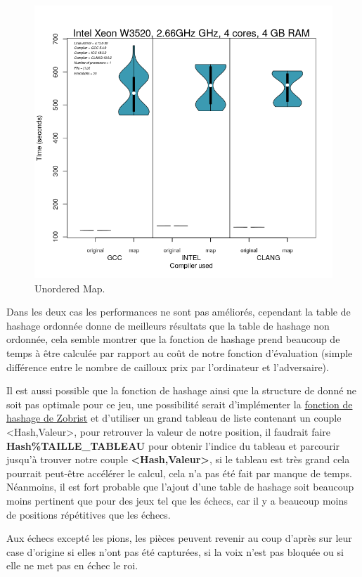\documentclass[
 aip,
 jmp,
 amsmath,amssymb,
 reprint
]{revtex4-1}
\begin{document}
\begin{figure}[H]
  \includegraphics[width=\linewidth, keepaspectratio=true]{unsorted_map.png}
  \caption{Unordered Map.\label{Fig:unsorted_map}}
\end{figure}

Dans les deux cas les performances ne sont pas améliorés, cependant la table de hashage ordonnée donne de meilleurs résultats que la table de hashage non ordonnée, cela semble montrer que la fonction de hashage prend beaucoup de temps à être calculée par rapport au coût de notre fonction d'évaluation (simple différence entre le nombre de cailloux prix par l'ordinateur et l'adversaire).\par
Il est aussi possible que la fonction de hashage ainsi que la structure de donné ne soit pas optimale pour ce jeu, une possibilité serait d'implémenter la \href{https://chessprogramming.wikispaces.com/Zobrist+Hashing}{fonction de hashage de Zobrist} et d'utiliser un grand tableau de liste contenant un couple <Hash,Valeur>, pour retrouver la valeur de notre position, il faudrait faire \textbf{Hash\%TAILLE\_TABLEAU} pour obtenir l'indice du tableau et parcourir jusqu'à trouver notre couple \textbf{<Hash,Valeur>}, si le tableau est très grand cela pourrait peut-être accélérer le calcul, cela n'a pas été fait par manque de temps. Néanmoins, il est fort probable que l'ajout d'une table de hashage soit beaucoup moins pertinent que pour des jeux tel que les échecs, car il y a beaucoup moins de positions répétitives que les échecs.\par
Aux échecs excepté les pions, les pièces peuvent revenir au coup d'après sur leur case d'origine si elles n'ont pas été capturées, si la voix n'est pas bloquée ou si elle ne met pas en échec le roi.
\end{document}
